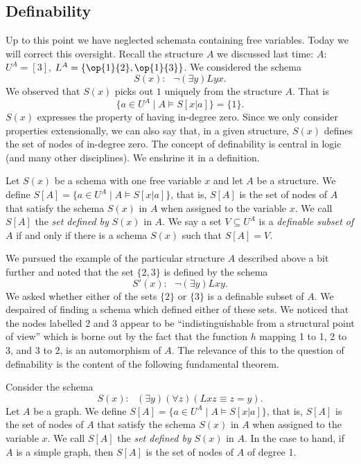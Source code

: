 \subsection{Definability}

Up to this point we have neglected schemata containing free variables. Today we will correct this oversight. 
Recall the structure $A$ we discussed last time:
$A$: $U^A=[3]$, $L^A=\{\op{1}{2},\op{1}{3}\}$.
We considered the schema
\[
S(x):\ \ \ \neg(\exists y)Lyx.
\]
We observed that $S(x)$ picks out $1$ uniquely from the structure $A$. That is
\[
\{a\in U^A\mid A\models S[x|a]\}=\{1\}.
\]
$S(x)$ expresses the property of having in-degree zero. Since we only consider properties extensionally, we can also say that, in a given structure, $S(x)$ defines the set of nodes of in-degree zero. The concept of definability is central in logic (and many other disciplines). We enshrine it in a definition.
\begin{definition}
Let $S(x)$ be a schema with one free variable $x$ and let $A$ be a structure.
We define $S[A]=\{a\in U^A\mid A\models S[x|a]\}$, that is, $S[A]$ is the set of nodes of $A$ that satisfy the schema $S(x)$ in $A$ when assigned to the variable $x$. We call $S[A]$ the \emph{set defined by} $S(x)$ in $A$. We say a set $V\subseteq U^A$ is 
a \emph{definable subset of} $A$ if and only if there is a schema $S(x)$ such that $S[A]=V$.
\end{definition}

We pursued the example of the particular structure $A$ described above a bit further and noted that the set $\{2,3\}$ is defined by the schema
\[
S'(x):\ \ \ \neg(\exists y)Lxy.
\]
We asked whether either of the sets $\{2\}$ or $\{3\}$ is a definable subset of $A$. 
We despaired of finding a schema which defined either of these sets.
We noticed that the nodes labelled 2 and 3 appear to be ``indistinguishable from a structural point of view'' which is borne out by the fact that the function $h$ mapping 1 to 1, 2 to 3, and 3 to 2, is an automorphism of $A$. The relevance of this to the question of definability is the content of the following fundamental theorem.


\iffalse


Consider the schema 
\[
S(x):\ \ \ (\exists y)(\forall z)(Lxz\equiv z=y).
\]
Let $A$ be a graph. We define $S[A]=\{a\in U^A\mid A\models S[x|a]\}$, that is, $S[A]$ is the set of nodes of $A$ that satisfy the schema $S(x)$ in $A$ when assigned to the variable $x$. We call $S[A]$ the \emph{set defined by} $S(x)$ in $A$. In the case to hand, if $A$ is a simple graph, then $S[A]$ is the set of nodes of $A$ of degree 1. 

